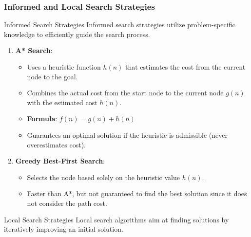 \documentclass[aspectratio=169]{beamer}
\begin{document}
\begin{frame}[fragile]
    \frametitle{Informed and Local Search Strategies}
    
    \begin{block}{Informed Search Strategies}
        Informed search strategies utilize problem-specific knowledge to efficiently guide the search process.
        
        \begin{enumerate}
            \item \textbf{A* Search}:
                \begin{itemize}
                    \item Uses a heuristic function $h(n)$ that estimates the cost from the current node to the goal.
                    \item Combines the actual cost from the start node to the current node $g(n)$ with the estimated cost $h(n)$.
                    \item \textbf{Formula}: $f(n) = g(n) + h(n)$
                    \item Guarantees an optimal solution if the heuristic is admissible (never overestimates cost).
                \end{itemize}
            \item \textbf{Greedy Best-First Search}:
                \begin{itemize}
                    \item Selects the node based solely on the heuristic value $h(n)$.
                    \item Faster than A*, but not guaranteed to find the best solution since it does not consider the path cost.
                \end{itemize}
        \end{enumerate}
    \end{block}
    
    \begin{block}{Local Search Strategies}
        Local search algorithms aim at finding solutions by iteratively improving an initial solution.
        

\end{block}
\end{frame}
\end{document}
